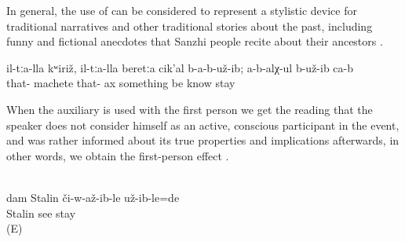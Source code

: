 In general, the use of  can be considered to represent a stylistic device for traditional narratives and other traditional stories about the past, including funny and fictional anecdotes that Sanzhi people recite about their ancestors .

\begin{exe}
	\ex	\label{ex:they had no machete nor ax, they did not know (these tools)}
	\gll	il-tːa-lla	kʷiriž,	il-tːa-lla	beretːa	cik'al	b-a-b-už-ib;	a-b-alχ-ul	b-už-ib	ca-b\\
		that-	machete	that-	ax	something	be	know	stay	\\
	\glt	{}
\end{exe}

When the auxiliary is used with the first person we get the reading that the speaker does not consider himself as an active, conscious participant in the event, and was rather informed about its true properties and implications afterwards, in other words, we obtain the first-person effect .

\begin{exe}
	\\\label{ex:(It turned out, that) I had seen Stalin@17}%
	\gll	dam	Stalin	či-w-až-ib-le	už-ib-le=de\\
			Stalin	see	stay\\
	\glt	{} (E)
\end{exe}
